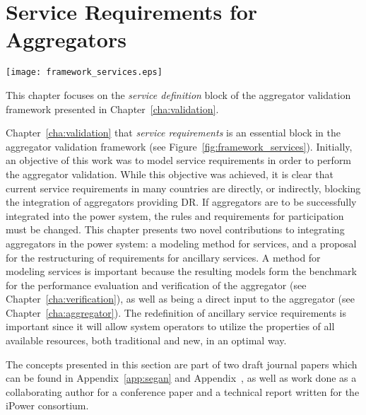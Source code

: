 \chapter{Service Requirements for Aggregators} %
\label{cha:services}
\begin{marginfigure}
	\texttt{[image: framework\_services.eps]}
	\caption{This chapter focuses on the \emph{service definition} block of the aggregator validation framework presented in Chapter~\ref{cha:validation}.}
      \label{fig:framework_services}
\end{marginfigure}
 Chapter~\ref{cha:validation} that \emph{service requirements} is an essential block in the aggregator validation framework (see Figure~\ref{fig:framework_services}). Initially, an objective of this work was to model service requirements in order to perform the aggregator validation. While this objective was achieved, it is clear that current service requirements in many countries are directly, or indirectly, blocking the integration of aggregators providing DR. If aggregators are to be successfully integrated into the power system, the rules and requirements for participation must be changed. This chapter presents two novel contributions to integrating aggregators in the power system: a modeling method for services, and a proposal for the restructuring of requirements for ancillary services. A method for modeling services is important because the resulting models form the benchmark for the performance evaluation and verification of the aggregator (see Chapter~\ref{cha:verification}), as well as being a direct input to the aggregator (see Chapter~\ref{cha:aggregator}). The redefinition of ancillary service requirements is important since it will allow system operators to utilize the properties of all available resources, both traditional and new, in an optimal way.

The concepts presented in this section are part of two draft journal papers which can be found in Appendix~\ref{app:segan} and Appendix~, as well as work done as a collaborating author for a conference paper and a technical report written for the iPower consortium.


